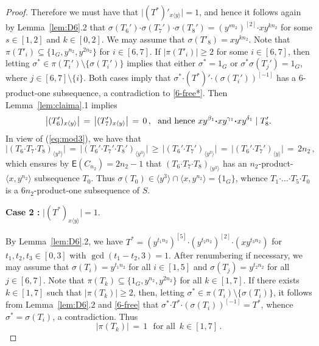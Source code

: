 \documentclass[leqno,a4paper]{amsart}
\def\bd{{\boldsymbol{\cdot}}}
\theoremstyle{plain}
\theoremstyle{definition}
\numberwithin{equation}{section}
\begin{document}
\begin{proof}
        Therefore we must have that $\big| (T^*)'_{x \langle y \rangle} \big| = 1$, and hence it follows again by Lemma~\ref{lem:D6}.2 that $\sigma(T_6') \bd \sigma(T_7') \bd \sigma(T_8') = (y^{sn_2})^{[2]} \bd xy^{kn_2}$ for some $s \in [1,2]$ and $k \in [0,2]$.
        We may assume that $\sigma (T'_8) = xy^{kn_2}$. Note that $\pi (T'_i) \subseteq \{ 1_G, y^{n_2}, y^{2n_2} \}$ for $i \in [6,7]$.  If $|\pi(T'_i)| \ge  2$ for some $i \in [6,7]$,
        then letting $\sigma^*\in \pi(T_i')\setminus \{\sigma(T_i')\}$ implies that either $\sigma^*=1_G$ or $\sigma^*\sigma(T_j')=1_G$, where $j\in [6,7]\setminus \{i\}$. Both cases imply that $\sigma^*\bd (T^*)'\bd (\sigma(T_i'))^{[-1]}$ has a 6-product-one subsequence, a contradiction to \eqref{6-free*}.
        Then Lemma~\ref{lem:claima}.1 implies
        \[
          \text{ $\big| (T_6')_{x\langle y \rangle} \big| \, = \, \big| (T_7')_{x\langle y \rangle} \big| \, = \, 0$\,, \, and hence $xy^{\beta_1} \bd xy^{\gamma_1} \bd xy^{\delta_1} \mid T_8'$. }
        \]
		In view of (\ref{eq:mod3}), we have that
		\[
          \big|(T_6 \bd T_7 \bd T_8)_{\langle y^3 \rangle} \big| \, = \, \big| (T_6' \bd T_7' \bd T_8')_{\langle y^3 \rangle} \big| \, \ge \, \big| (T_6' \bd T_7')_{\langle y^3 \rangle} \big| \, = \, \big| (T_6' \bd T_7')_{\langle y \rangle} \big| \, = \, 2n_2 \,,
        \]
		which ensures by $\mathsf E (C_{n_2}) = 2n_2 - 1$ that $(T_6 \bd T_7 \bd T_8)_{\langle y^3 \rangle}$ has an $n_2$-product-$\langle x,y^{n_2} \rangle$ subsequence $T_0$.
        Thus $\sigma(T_0) \in \langle y^3 \rangle \cap \langle x,y^{n_2} \rangle = \{ 1_G \}$, whence $T_1 \bd \ldots \bd T_5 \bd T_0$ is a $6n_2$-product-one subsequence of $S$.
		


		\smallskip
		\noindent
		{\bf Case 2 :} $\big| (T^*)_{x \langle y \rangle} \big| = 1$.
		\smallskip


        By Lemma~\ref{lem:D6}.2, we have $T^*= (y^{t_1n_2})^{[5]}\bd (y^{t_2n_2})^{[2]} \bd (xy^{t_3n_2})$ for $t_1, t_2, t_3 \in [0,3]$ with $\gcd (t_1 - t_2, 3) = 1$.
		After renumbering if necessary, we may assume that $\sigma(T_i)=y^{t_1n_2}$ for all $i\in [1,5]$ and $\sigma(T_j)= y^{t_2n_2}$ for all $j\in [6,7]$.
        Note that $\pi (T_k) \subseteq \{ 1_G, y^{n_2}, y^{2n_2} \}$ for all $k \in [1,7]$. If there exists $k\in [1,7]$ such that $|\pi(T_k)|\ge 2$, then,  letting  $\sigma^*\in \pi(T_i)\setminus \{\sigma(T_i)\}$, it follows from Lemma~\ref{lem:D6}.2 and \eqref{6-free} that $\sigma^*\bd T^*\bd (\sigma(T_i))^{[-1]}=T^*$, whence $\sigma^*=\sigma(T_i)$, a contradiction.
        Thus
        \[
          |\pi(T_k)| \, = \, 1 \,\, \mbox{ for all } \, k \in [1,7] \,.
        \]







\end{proof}
\end{document}

